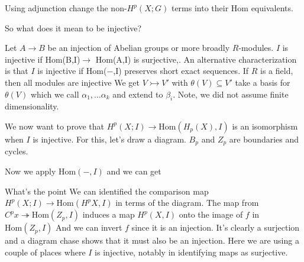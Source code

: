 \documentclass[10pt]{article}
\theoremstyle{definition}
\begin{document}
	\begin{center}
	\end{center}
	Using adjunction change the non-$H^p(X;G)$ terms into their Hom equivalents. 
	
	
	So what does it mean to be injective?
	
	Let $A\to B$ be an injection of Abelian groups or more broadly $R$-modules. $I$ is injective if Hom(B,I)$\to $ Hom(A,I) is surjective,. An alternative characterization is that $I$ is injective if Hom($-$,I) preserves short exact sequences. 
	If $R$ is a field, then all modules are injective We get $V\rightarrowtail V'$ with $\theta(V)\subseteq V'$ take a basis for $\theta(V)$ which we call $\alpha_1,\dots \alpha_k$ and extend to $\beta_i$. Note, we did not assume finite dimensionality. 
	
	We now want to prove that $H^p(X;I)\to \text{Hom}(H_p(X),I)$ is an isomorphism when $I$ is injective. For this, let's draw a diagram. $B_p$ and $Z_p$ are boundaries and cycles. 
	
	\begin{center}
	\end{center}
	Now we apply $\text{Hom}(-,I)$ and we can get 
	\begin{center}
	\end{center}
	What's the point We can identified the comparison map $H^p(X; I)\to \text{Hom}(H^p X, I)$ in terms of the diagram. The map from $C^p x\twoheadrightarrow\text{Hom}(Z_p,I)$ induces a map $H^p(X,I)$ onto the image of $f$ in $\text{Hom}(Z_p,I)$ And we can invert $f$ since it is an injection. It's clearly a surjection and a diagram chase shows that it must also be an injection. Here we are using a couple of places where $I$ is injective, notably in identifying maps as surjective. 
	
\end{document}
